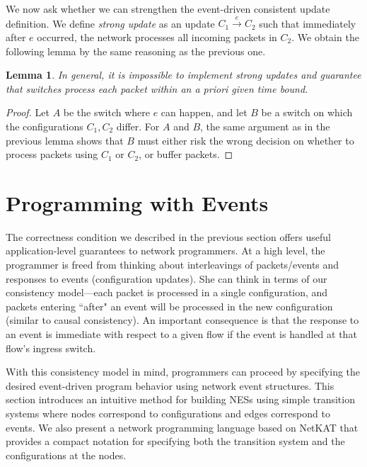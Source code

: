 \documentclass[pldi-cameraready]{sigplanconf}
\newtheorem{lemma}{Lemma}
\begin{document}
\noindent We now ask whether we can strengthen the event-driven
consistent update definition. We define {\em strong update} as an
update $C_1 \xrightarrow{e} C_2$ such that immediately after 
$e$ occurred, the network processes all incoming packets in $C_2$. We
obtain the following lemma by the same reasoning as the previous one.
\begin{lemma}
\label{lem:packet}
In general, it is impossible to implement strong updates and guarantee that
switches process each packet within an {a priori} given time bound.
\end{lemma}
\begin{proof}
Let $A$ be the switch where $e$ can happen, and let $B$ be a switch
on which the configurations $C_1, C_2$ differ. For $A$ and $B$,
the same argument as in the previous lemma shows that $B$ must
either risk the wrong decision on whether to process packets using
$C_1$ or $C_2$, or buffer packets.
\end{proof}


\renewcommand*{\proofname}{Proof}







\section{Programming with Events}
\label{sec:model}
The correctness condition we described in the previous section
offers useful application-level guarantees to network programmers.
 At a high level, the programmer is freed from thinking about 
  interleavings of packets/events and responses to events
  (configuration updates). She can think in terms of our consistency
  model---each packet is processed in a single configuration,
  and packets entering ``after" an event will be processed in the new
  configuration (similar to causal consistency). An important consequence is that the response to an event is immediate with respect to a
  given flow if the event is handled at that flow's ingress switch.

With this consistency model in mind, programmers can proceed by
specifying the desired event-driven program behavior using network
event structures. This section introduces an intuitive method for building NESs using
simple transition systems where nodes correspond to configurations and edges
correspond to events. We also present a network programming language
based on NetKAT that provides a compact notation for specifying both the
transition system and the configurations at the nodes.
\end{document}
